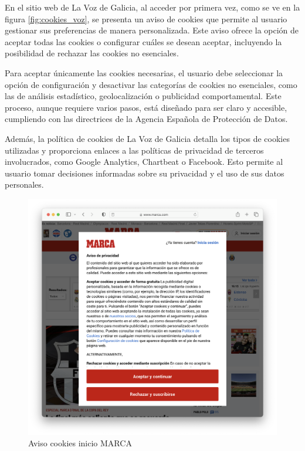 En el sitio web de La Voz de Galicia, al acceder por primera vez, como se ve en la figura \ref{fig:cookies_voz}, se presenta un aviso de cookies que permite al usuario gestionar sus preferencias de manera personalizada. Este aviso ofrece la opción de aceptar todas las cookies o configurar cuáles se desean aceptar, incluyendo la posibilidad de rechazar las cookies no esenciales.

Para aceptar únicamente las cookies necesarias, el usuario debe seleccionar la opción de configuración y desactivar las categorías de cookies no esenciales, como las de análisis estadístico, geolocalización o publicidad comportamental. Este proceso, aunque requiere varios pasos, está diseñado para ser claro y accesible, cumpliendo con las directrices de la Agencia Española de Protección de Datos.

Además, la política de cookies de La Voz de Galicia detalla los tipos de cookies utilizadas y proporciona enlaces a las políticas de privacidad de terceros involucrados, como Google Analytics, Chartbeat o Facebook. Esto permite al usuario tomar decisiones informadas sobre su privacidad y el uso de sus datos personales.

\begin{figure}[H]
    \centering
    \includegraphics[width=\textwidth]{cookies_marca.png}
    \caption{Aviso cookies inicio MARCA}
    \label{fig:cookies_marca}
\end{figure}


